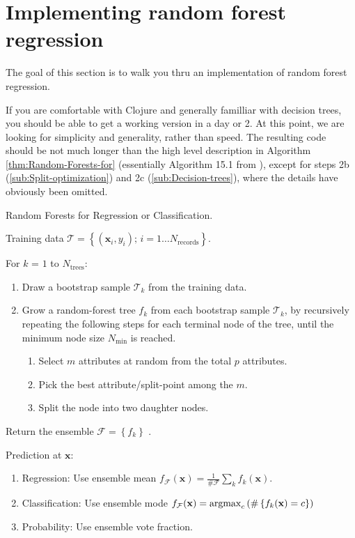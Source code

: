 \documentclass[10pt,openany]{article}
\numberwithin{definition}{section}
\numberwithin{example}{section}
\numberwithin{equation}{section}
\numberwithin{figure}{section}
\begin{document}
\newpage{}

\section{\label{sec:Implementing-random-forest}Implementing random forest
regression}

The goal of this section is to walk you thru an implementation of
random forest regression.

If you are comfortable with Clojure and generally familliar with decision
trees, you should be able to get a working version in a day or 2.
At this point, we are looking for simplicity and generality, rather
than speed. The resulting code should be not much longer than the
high level description in Algorithm \ref{thm:Random-Forests-for}
(essentially Algorithm 15.1 from \cite{hastie-tibshirani-friedman-2009}),
except for steps 2b (\autoref{sub:Split-optimization}) and 2c
(\autoref{sub:Decision-trees}), where the details have obviously
been omitted.
\begin{algorithm}
\label{thm:Random-Forests-for}Random Forests for Regression or Classification. 

Training data $\mathcal{T}=\left\{ (\mathbf{x}_{i},y_{i});\,i=1\ldots N_{\textrm{records}}\right\} $.

For $k$ = $1$ to $N_{\textrm{trees}}$: 
\begin{enumerate}
\item Draw a bootstrap sample $\mathcal{T}_{k}$ from the training data. 
\item Grow a random-forest tree $f_{k}$ from each bootstrap sample $\mathcal{T}_{k}$,
by recursively repeating the following steps for each terminal node
of the tree, until the minimum node size $N_{\min}$ is reached. 

\begin{enumerate}
\item Select $m$ attributes at random from the total $p$ attributes. 
\item Pick the best attribute/split-point among the $m$.
\item Split the node into two daughter nodes. 
\end{enumerate}
\end{enumerate}
Return the ensemble $\mathcal{F}=\left\{ f_{k}\right\} $ . 

Prediction at $\mathbf{x}$: 
\begin{enumerate}
\item Regression: Use ensemble mean 
$f_{\mathcal{F}}(\mathbf{x})=\frac{1}{\#\mathcal{F}}\sum_{k}f_{k}(\mathbf{x})$. 
\item Classification: Use ensemble mode 
$f_{\mathcal{F}}(\mathbf{x})=\operatorname*{argmax}_{c}\left(\#\left\{ f_{k}(\mathbf{x})=c\right\} \right)$
\item Probability: Use ensemble vote fraction.
\end{enumerate}
\end{algorithm}
\end{document}
